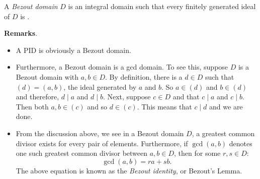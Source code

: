 \documentclass[12pt]{article}
\begin{document}
A \emph{Bezout domain} $D$ is an integral domain such that every finitely generated ideal of $D$ is .

\textbf{Remarks}.  
\begin{itemize}
\item A PID is obviously a Bezout domain.  
\item Furthermore, a Bezout domain is a gcd domain.  To see this, suppose $D$ is a Bezout domain with $a,b\in D$.  By definition, there is a $d\in D$ such that $(d)=(a,b)$, the ideal generated by $a$ and $b$.  So $a\in (d)$ and $b\in (d)$ and therefore, $d\mid a$ and $d\mid b$.  Next, suppose $c\in D$ and that $c\mid a$ and $c\mid b$.  Then both $a,b\in (c)$ and so $d\in (c)$.  This means that $c\mid d$ and we are done.
\item From the discussion above, we see in a Bezout domain $D$, a greatest common divisor exists for every pair of elements.  Furthermore, if $\operatorname{gcd}(a,b)$ denotes one such greatest common divisor between $a,b\in D$, then for some $r,s\in D$:
$$\operatorname{gcd}(a,b)=ra+sb.$$
The above equation is known as the \emph{Bezout identity}, or Bezout's Lemma.
\end{itemize}
\end{document}
